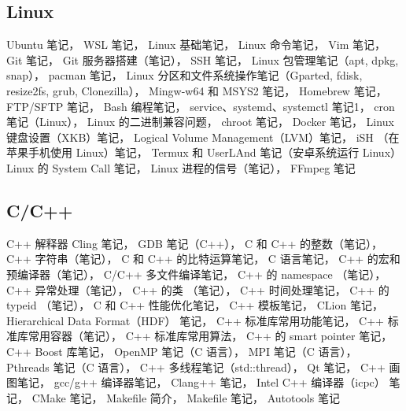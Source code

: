 \subsection{Linux}
Ubuntu 笔记，
WSL 笔记，
Linux 基础笔记，
Linux 命令笔记，
Vim 笔记，
Git 笔记，
Git 服务器搭建（笔记），
SSH 笔记，
Linux 包管理笔记（apt, dpkg, snap），
pacman 笔记，
Linux 分区和文件系统操作笔记（Gparted, fdisk, resize2fs, grub, Clonezilla），
Mingw-w64 和 MSYS2 笔记，
Homebrew 笔记，
FTP/SFTP 笔记，
Bash 编程笔记，
service、systemd、systemctl 笔记1，
cron 笔记（Linux），
Linux 的二进制兼容问题，
chroot 笔记，
Docker 笔记，
Linux 键盘设置（XKB）笔记，
Logical Volume Management（LVM）笔记，
iSH （在苹果手机使用 Linux）笔记，
Termux 和 UserLAnd 笔记（安卓系统运行 Linux）
Linux 的 System Call 笔记，
Linux 进程的信号（笔记），
FFmpeg 笔记

\subsection{C/C++}
C++ 解释器 Cling 笔记，
GDB 笔记（C++），
C 和 C++ 的整数（笔记），
C++ 字符串（笔记），
C 和 C++ 的比特运算笔记，
C 语言笔记，
C++ 的宏和预编译器（笔记），
C/C++ 多文件编译笔记，
C++ 的 namespace （笔记），
C++ 异常处理（笔记），
C++ 的类 （笔记），
C++ 时间处理笔记，
C++ 的 typeid （笔记），
C 和 C++ 性能优化笔记，
C++ 模板笔记，
CLion 笔记，
Hierarchical Data Format（HDF） 笔记，
C++ 标准库常用功能笔记，
C++ 标准库常用容器（笔记），
C++ 标准库常用算法，
C++ 的 smart pointer 笔记，
C++ Boost 库笔记，
OpenMP 笔记（C 语言），
MPI 笔记（C 语言），
Pthreads 笔记（C 语言），
C++ 多线程笔记（std::thread），
Qt 笔记，
C++ 画图笔记，
gcc/g++ 编译器笔记，
Clang++ 笔记，
Intel C++ 编译器（icpc） 笔记，
CMake 笔记，
Makefile 简介，
Makefile 笔记，
Autotools 笔记

